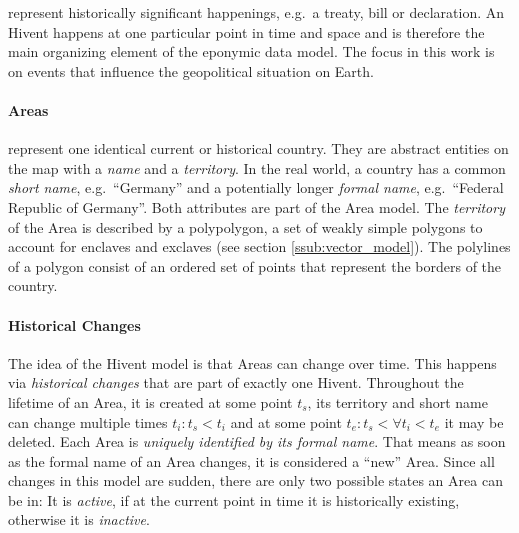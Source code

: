represent historically significant happenings, e.g.\ a treaty, bill or declaration.
An Hivent happens at one particular point in time and space and is therefore the main organizing element of the eponymic data model.
The focus in this work is on events that influence the geopolitical situation on Earth.


\vspace{-1em}
\paragraph{Areas} %
\label{par:area}

represent one identical current or historical country. They are abstract entities on the map with a \emph{name} and a \emph{territory}. In the real world, a country has a common \emph{short name}, e.g.\ ``Germany'' and a potentially longer \emph{formal name}, e.g.\ ``Federal Republic of Germany''. Both attributes are part of the Area model. The \emph{territory} of the Area is described by a polypolygon, a set of weakly simple polygons to account for enclaves and exclaves (see section \ref{ssub:vector_model}). The polylines of a polygon consist of an ordered set of points that represent the borders of the country.


\vspace{-1em}
\paragraph{Historical Changes} %
\label{par:historical_changes}

The idea of the Hivent model is that Areas can change over time. This happens via \emph{historical changes} that are part of exactly one Hivent. Throughout the lifetime of an Area, it is created at some point $t_s$, its territory and short name can change multiple times $t_i: t_s < t_i$ and at some point $t_e: t_s < \forall t_i < t_e$ it may be deleted.
Each Area is \emph{uniquely identified by its formal name}. That means as soon as the formal name of an Area changes, it is considered a ``new'' Area.
Since all changes in this model are sudden, there are only two possible states an Area can be in: It is \emph{active}, if at the current point in time it is historically existing, otherwise it is \emph{inactive}.

